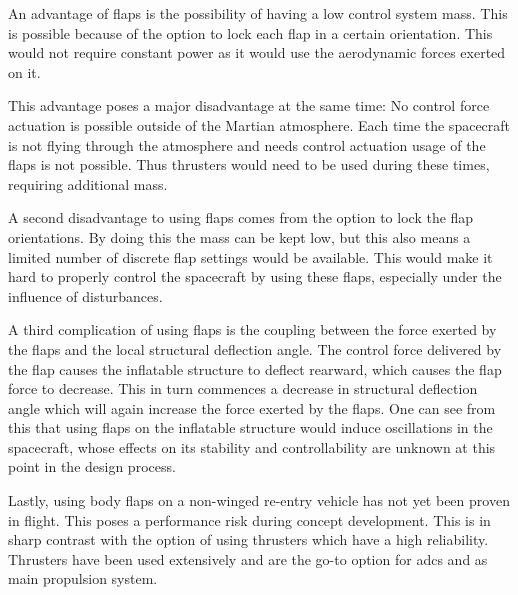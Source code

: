 An advantage of flaps is the possibility of having a low control system mass. This is possible because of the option to lock each flap in a certain orientation. This would not require constant power as it would use the aerodynamic forces exerted on it.

This advantage poses a major disadvantage at the same time: No control force actuation is possible outside of the Martian atmosphere. Each time the spacecraft is not flying through the atmosphere and needs control actuation usage of the flaps is not possible. Thus thrusters would need to be used during these times, requiring additional mass.

A second disadvantage to using flaps comes from the option to lock the flap orientations. By doing this the mass can be kept low, but this also means a limited number of discrete flap settings would be available. This would make it hard to properly control the spacecraft by using these flaps, especially under the influence of disturbances.

A third complication of using flaps is the coupling between the force exerted by the flaps and the local structural deflection angle. The control force delivered by the flap causes the inflatable structure to deflect rearward, which causes the flap force to decrease. This in turn commences a decrease in structural deflection angle which will again increase the force exerted by the flaps. One can see from this that using flaps on the inflatable structure would induce oscillations in the spacecraft, whose effects on its stability and controllability are unknown at this point in the design process.

Lastly, using body flaps on a non-winged re-entry vehicle has not yet been proven in flight. This poses a performance risk during concept development. This is in sharp contrast with the option of using thrusters which have a high reliability. Thrusters have been used extensively and are the go-to option for \gls{adcs} and as main propulsion system.